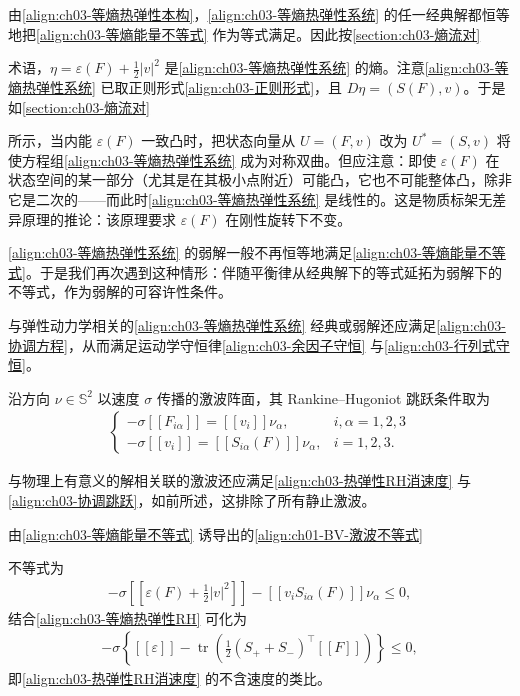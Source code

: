 ﻿\documentclass[../../main.tex]{subfiles}
\begin{document}
由\eqref{align:ch03-等熵热弹性本构}，\eqref{align:ch03-等熵热弹性系统} 的任一经典解都恒等地把\eqref{align:ch03-等熵能量不等式} 作为等式满足。因此按\cref{section:ch03-熵流对}%

术语，$\eta=\varepsilon(F)+\frac{1}{2}|v|^{2}$ 是\eqref{align:ch03-等熵热弹性系统} 的熵。注意\eqref{align:ch03-等熵热弹性系统} 已取正则形式\eqref{align:ch03-正则形式}，且 $D\eta=(S(F),v)$。于是如\cref{section:ch03-熵流对}%

所示，当内能 $\varepsilon(F)$ 一致凸时，把状态向量从 $U=(F,v)$ 改为 $U^{*}=(S,v)$ 将使方程组\eqref{align:ch03-等熵热弹性系统} 成为对称双曲。但应注意：即使 $\varepsilon(F)$ 在状态空间的某一部分（尤其是在其极小点附近）可能凸，它也不可能整体凸，除非它是二次的——而此时\eqref{align:ch03-等熵热弹性系统} 是线性的。这是物质标架无差异原理的推论：该原理要求 $\varepsilon(F)$ 在刚性旋转下不变。

\eqref{align:ch03-等熵热弹性系统} 的弱解一般不再恒等地满足\eqref{align:ch03-等熵能量不等式}。于是我们再次遇到这种情形：伴随平衡律从经典解下的等式延拓为弱解下的不等式，作为弱解的可容许性条件。

与弹性动力学相关的\eqref{align:ch03-等熵热弹性系统} 经典或弱解还应满足\eqref{align:ch03-协调方程}，从而满足运动学守恒律\eqref{align:ch03-余因子守恒} 与\eqref{align:ch03-行列式守恒}。

沿方向 $\nu\in\mathbb{S}^{2}$ 以速度 $\sigma$ 传播的激波阵面，其 Rankine--Hugoniot 跳跃条件取为
\begin{align}
\begin{cases}
-\sigma[\![F_{i\alpha}]\!]=[\![v_{i}]\!]\nu_{\alpha}, & i,\alpha=1,2,3\\
-\sigma[\![v_{i}]\!]=[\![S_{i\alpha}(F)]\!]\nu_{\alpha}, & i=1,2,3.
\end{cases}
\label{align:ch03-等熵热弹性RH}
\end{align}

与物理上有意义的解相关联的激波还应满足\eqref{align:ch03-热弹性RH消速度} 与\eqref{align:ch03-协调跳跃}，如前所述，这排除了所有静止激波。

由\eqref{align:ch03-等熵能量不等式} 诱导出的\eqref{align:ch01-BV-激波不等式}%

不等式为
\begin{align}
-\sigma[\![\varepsilon(F)+\frac{1}{2}|v|^{2}]\!]-[\![v_{i}S_{i\alpha}(F)]\!]\nu_{\alpha}\leqslant0,
\label{align:ch03-等熵熵不等式}
\end{align}
结合\eqref{align:ch03-等熵热弹性RH} 可化为
\begin{align}
-\sigma\left\{[\![\varepsilon]\!]-\operatorname{tr}\left(\frac{1}{2}(S_{+}+S_{-})^{\top}[\![F]\!]\right)\right\}\leqslant0,
\label{align:ch03-等熵RH熵条件}
\end{align}
即\eqref{align:ch03-热弹性RH消速度} 的不含速度的类比。
\end{document}
